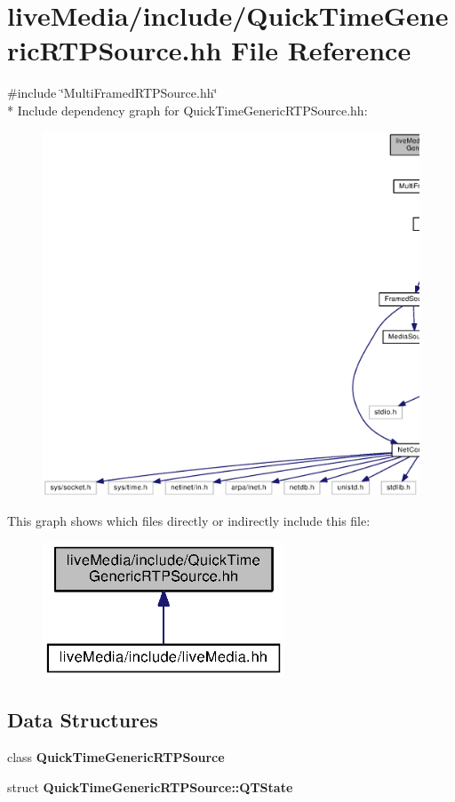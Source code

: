 \section{live\+Media/include/\+Quick\+Time\+Generic\+R\+T\+P\+Source.hh File Reference}
\label{QuickTimeGenericRTPSource_8hh}
{\ttfamily \#include \char`\"{}Multi\+Framed\+R\+T\+P\+Source.\+hh\char`\"{}}\\*
Include dependency graph for Quick\+Time\+Generic\+R\+T\+P\+Source.\+hh\+:
\nopagebreak
\begin{figure}[H]
\begin{center}
\leavevmode
\includegraphics[width=350pt]{QuickTimeGenericRTPSource_8hh__incl}
\end{center}
\end{figure}
This graph shows which files directly or indirectly include this file\+:
\nopagebreak
\begin{figure}[H]
\begin{center}
\leavevmode
\includegraphics[width=204pt]{QuickTimeGenericRTPSource_8hh__dep__incl}
\end{center}
\end{figure}
\subsection*{Data Structures}
\begin{DoxyCompactItemize}
\item 
class {\bf Quick\+Time\+Generic\+R\+T\+P\+Source}
\item 
struct {\bf Quick\+Time\+Generic\+R\+T\+P\+Source\+::\+Q\+T\+State}
\end{DoxyCompactItemize}
